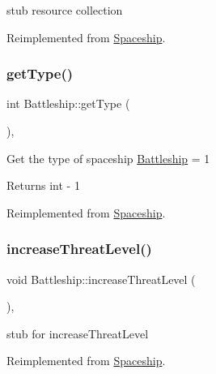 stub resource collection 

Reimplemented from \hyperlink{classSpaceship_ad2027533de1d789db5e3efa22055f2d0}{Spaceship}.

\mbox{\label{classBattleship_a5fadf030665554b56456467e98c75228}} 
\subsubsection{\texorpdfstring{get\+Type()}{getType()}}
{\footnotesize\ttfamily int Battleship\+::get\+Type (\begin{DoxyParamCaption}{ }\end{DoxyParamCaption})\hspace{0.3cm}{\ttfamily [inline]}, {\ttfamily [virtual]}}

Get the type of spaceship \hyperlink{classBattleship}{Battleship} = 1 \begin{DoxyReturn}{Returns}
int -\/ 1 
\end{DoxyReturn}


Reimplemented from \hyperlink{classSpaceship_a113055e6d793f8fbc55e44efc4d57e07}{Spaceship}.

\mbox{\label{classBattleship_a4db634686a840f3348c2a124e5f42d66}} 
\subsubsection{\texorpdfstring{increase\+Threat\+Level()}{increaseThreatLevel()}}
{\footnotesize\ttfamily void Battleship\+::increase\+Threat\+Level (\begin{DoxyParamCaption}{ }\end{DoxyParamCaption})\hspace{0.3cm}{\ttfamily [inline]}, {\ttfamily [virtual]}}

stub for increase\+Threat\+Level 

Reimplemented from \hyperlink{classSpaceship_a5ddf702124286d9d3a6b5e64c09515bc}{Spaceship}.

\mbox{\label{classBattleship_a41f44a1437e169165b943c3b98316f32}} 
